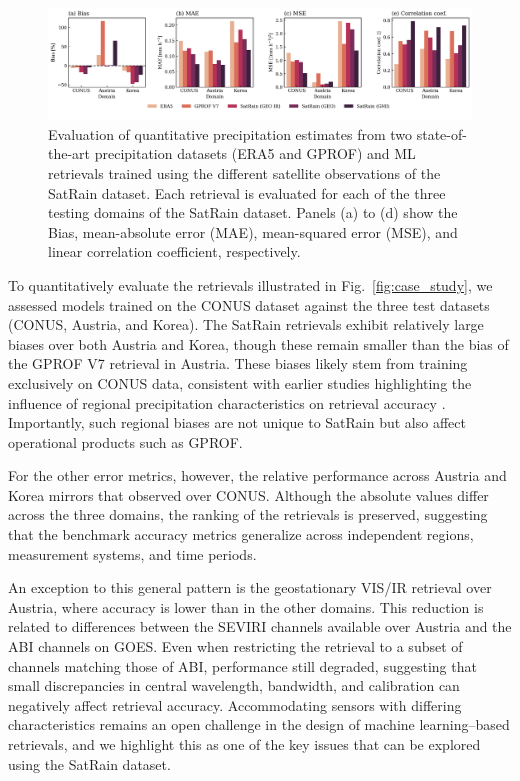 \documentclass[11pt]{article}
\begin{document}
\begin{figure}[htbp] %
	\centering
	\includegraphics[width=1.0\textwidth]{figures/fig10}
	\caption{
		Evaluation of quantitative precipitation estimates from two state-of-the-art
		precipitation datasets (ERA5 and GPROF) and ML retrievals trained using the
		different satellite observations of the SatRain dataset. Each retrieval is
		evaluated for each of the three testing domains of the SatRain dataset. Panels
		(a) to (d) show the Bias, mean-absolute error (MAE), mean-squared error (MSE),
		and linear correlation coefficient, respectively.
	}
	\label{fig:sensor_comparison}
\end{figure}

To quantitatively evaluate the retrievals illustrated in Fig.~\ref{fig:case_study}, we assessed models trained on the CONUS dataset against the three test datasets (CONUS, Austria, and Korea). The SatRain retrievals exhibit relatively large biases over both Austria and Korea, though these remain smaller than the bias of the GPROF V7 retrieval in Austria. These biases likely stem from training exclusively on CONUS data, consistent with earlier studies highlighting the influence of regional precipitation characteristics on retrieval accuracy \citep{Sohn2013WarmRain}. Importantly, such regional biases are not unique to SatRain but also affect operational products such as GPROF.

For the other error metrics, however, the relative performance across Austria and Korea mirrors that observed over CONUS. Although the absolute values differ across the three domains, the ranking of the retrievals is preserved, suggesting that the benchmark accuracy metrics generalize across independent regions, measurement systems, and time periods.

An exception to this general pattern is the geostationary VIS/IR retrieval over Austria, where accuracy is lower than in the other domains. This reduction is related to differences between the SEVIRI channels available over Austria and the ABI channels on GOES. Even when restricting the retrieval to a subset of channels matching those of ABI, performance still degraded, suggesting that small discrepancies in central wavelength, bandwidth, and calibration can negatively affect retrieval accuracy. Accommodating sensors with differing characteristics remains an open challenge in the design of machine learning–based retrievals, and we highlight this as one of the key issues that can be explored using the SatRain dataset.
\end{document}
